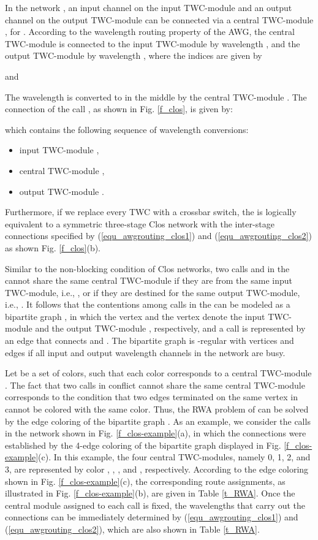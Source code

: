 \documentclass[journal]{IEEEtran}
\begin{document}
In the network , an input channel
 on the input TWC-module  and an output
channel  on the output TWC-module  can be
connected via a central TWC-module , for
. According to the wavelength routing
property of the AWG, the central TWC-module  is connected to
the input TWC-module  by wavelength , and the
output TWC-module  by wavelength , where the
indices are given by

and

The wavelength  is converted to  in the middle
by the central TWC-module . The connection of the call
, as shown in Fig. \ref{f_clos},
is given by: \setlength{\arraycolsep}{0.1em}

which contains the following sequence of wavelength conversions:
\begin{itemize}
\item input TWC-module ,
\item central TWC-module ,
\item output TWC-module .
\end{itemize}
Furthermore, if we replace every TWC with a crossbar switch, the
 is logically equivalent to a symmetric
three-stage Clos network \cite{Ttlee:book2011} with the inter-stage
connections specified by (\ref{equ_awgrouting_clos1}) and
(\ref{equ_awgrouting_clos2}) as shown Fig. \ref{f_clos}(b).

Similar to the non-blocking condition of Clos networks, two calls
 and
 in the
 cannot share the same central TWC-module if
they are from the same input TWC-module, i.e.,
, or if they are destined for the same
output TWC-module, i.e., . It follows that
the contentions among calls in the  can be
modeled as a bipartite graph , in which the vertex
 and the vertex  denote the input
TWC-module  and the output TWC-module , respectively,
and a call  is represented by an
edge  that connects  and .
The bipartite graph  is -regular with  vertices
and  edges if all input and output wavelength channels in the
network  are busy.

Let  be a set of colors, such that each color
 corresponds to a central TWC-module .
The fact that two calls in conflict cannot share the same central
TWC-module corresponds to the condition that two edges terminated on
the same vertex in  cannot be colored with the same
color. Thus, the RWA problem of  can be
solved by the edge coloring of the bipartite graph .
As an example, we consider the calls in the network  shown in Fig. \ref{f_clos-example}(a), in which the
connections were established by the 4-edge coloring of the bipartite
graph displayed in Fig. \ref{f_clos-example}(c). In this example,
the four central TWC-modules, namely 0, 1, 2, and 3, are represented
by color , , , and , respectively.
According to the edge coloring shown in Fig.
\ref{f_clos-example}(c), the corresponding route assignments, as
illustrated in Fig. \ref{f_clos-example}(b), are given in Table
\ref{t_RWA}. Once the central module assigned to each call is fixed,
the wavelengths that carry out the connections can be immediately
determined by (\ref{equ_awgrouting_clos1}) and
(\ref{equ_awgrouting_clos2}), which are also shown in Table
\ref{t_RWA}.
\end{document}
